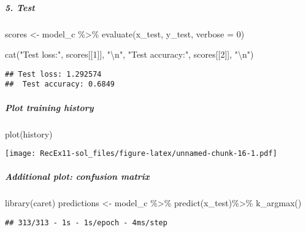 \documentclass[
]{article}
\newenvironment{Shaded}{\begin{snugshade}}{\end{snugshade}}
\newcommand{\AttributeTok}[1]{\textcolor[rgb]{0.77,0.63,0.00}{#1}}
\newcommand{\DecValTok}[1]{\textcolor[rgb]{0.00,0.00,0.81}{#1}}
\newcommand{\FunctionTok}[1]{\textcolor[rgb]{0.00,0.00,0.00}{#1}}
\newcommand{\NormalTok}[1]{#1}
\newcommand{\OtherTok}[1]{\textcolor[rgb]{0.56,0.35,0.01}{#1}}
\newcommand{\SpecialCharTok}[1]{\textcolor[rgb]{0.00,0.00,0.00}{#1}}
\newcommand{\StringTok}[1]{\textcolor[rgb]{0.31,0.60,0.02}{#1}}
\begin{document}
\hypertarget{test-1}{%
\subparagraph{5. Test}\label{test-1}}

\begin{Shaded}
\begin{Highlighting}[]
\NormalTok{scores }\OtherTok{\textless{}{-}}\NormalTok{ model\_c }\SpecialCharTok{\%\textgreater{}\%} \FunctionTok{evaluate}\NormalTok{(x\_test, y\_test, }\AttributeTok{verbose =} \DecValTok{0}\NormalTok{)}

\FunctionTok{cat}\NormalTok{(}\StringTok{"Test loss:"}\NormalTok{, scores[[}\DecValTok{1}\NormalTok{]], }\StringTok{"}\SpecialCharTok{\textbackslash{}n}\StringTok{"}\NormalTok{,}
    \StringTok{"Test accuracy:"}\NormalTok{, scores[[}\DecValTok{2}\NormalTok{]], }\StringTok{"}\SpecialCharTok{\textbackslash{}n}\StringTok{"}\NormalTok{)}
\end{Highlighting}
\end{Shaded}

\begin{verbatim}
## Test loss: 1.292574 
##  Test accuracy: 0.6849
\end{verbatim}

\hypertarget{plot-training-history-1}{%
\subparagraph{Plot training history}\label{plot-training-history-1}}

\begin{Shaded}
\begin{Highlighting}[]
\FunctionTok{plot}\NormalTok{(history)}
\end{Highlighting}
\end{Shaded}

\texttt{[image: RecEx11-sol\_files/figure-latex/unnamed-chunk-16-1.pdf]}

\hypertarget{additional-plot-confusion-matrix-1}{%
\subparagraph{Additional plot: confusion
matrix}\label{additional-plot-confusion-matrix-1}}

\begin{Shaded}
\begin{Highlighting}[]
\FunctionTok{library}\NormalTok{(caret)}
\NormalTok{predictions }\OtherTok{\textless{}{-}}\NormalTok{ model\_c }\SpecialCharTok{\%\textgreater{}\%} \FunctionTok{predict}\NormalTok{(x\_test)}\SpecialCharTok{\%\textgreater{}\%} \FunctionTok{k\_argmax}\NormalTok{()}
\end{Highlighting}
\end{Shaded}

\begin{verbatim}
## 313/313 - 1s - 1s/epoch - 4ms/step
\end{verbatim}
\end{document}
